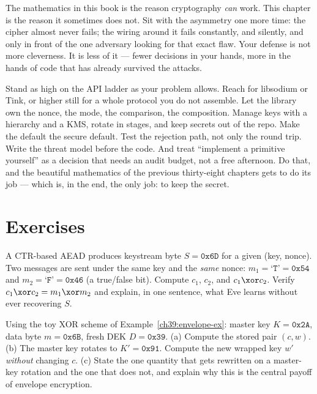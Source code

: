 The mathematics in this book is the reason cryptography \emph{can} work. This
chapter is the reason it sometimes does not. Sit with the asymmetry one more time:
the cipher almost never fails; the wiring around it fails constantly, and silently,
and only in front of the one adversary looking for that exact flaw. Your defense is
not more cleverness. It is less of it --- fewer decisions in your hands, more in the
hands of code that has already survived the attacks.

Stand as high on the API ladder as your problem allows. Reach for libsodium or
Tink, or higher still for a whole protocol you do not assemble. Let the library
own the nonce, the mode, the comparison, the composition. Manage keys with a
hierarchy and a KMS, rotate in stages, and keep secrets out of the repo. Make the
default the secure default. Test the rejection path, not only the round trip. Write
the threat model before the code. And treat ``implement a primitive yourself'' as a
decision that needs an audit budget, not a free afternoon. Do that, and the
beautiful mathematics of the previous thirty-eight chapters gets to do its job ---
which is, in the end, the only job: to keep the secret.

\section*{Exercises}

\begin{exercise}
A CTR-based AEAD produces keystream byte $S = \texttt{0x6D}$ for a given
(key, nonce). Two messages are sent under the same key and the \emph{same} nonce:
$m_1 = \text{`}\texttt{T}\text{'} = \texttt{0x54}$ and
$m_2 = \text{`}\texttt{F}\text{'} = \texttt{0x46}$ (a true/false bit). Compute
$c_1$, $c_2$, and $c_1 \xor c_2$. Verify $c_1 \xor c_2 = m_1 \xor m_2$ and explain,
in one sentence, what Eve learns without ever recovering $S$.
\end{exercise}

\begin{exercise}
Using the toy XOR scheme of Example~\ref{ch39:envelope-ex}: master key
$K = \texttt{0x2A}$, data byte $m = \texttt{0x6B}$, fresh DEK $D = \texttt{0x39}$.
(a) Compute the stored pair $(c, w)$. (b) The master key rotates to
$K' = \texttt{0x91}$. Compute the new wrapped key $w'$ \emph{without} changing $c$.
(c) State the one quantity that gets rewritten on a master-key rotation and the one
that does not, and explain why this is the central payoff of envelope encryption.
\end{exercise}

